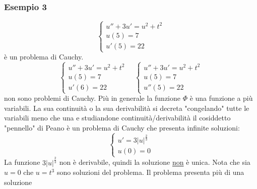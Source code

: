 \subsubsection*{Esempio 3}
\[
	\begin{cases}
		u'' + 3 u' = u^2 + t^2 \\
		u \left( 5 \right) = 7 \\
		u' \left( 5 \right) = 22
	\end{cases}
\]
è un problema di Cauchy.
\[
	\begin{cases}
		u'' + 3 u' = u^2 + t^2 \\
		u \left( 5 \right) = 7 \\
		u' \left( 6 \right) = 22
	\end{cases}
	\quad
	\begin{cases}
		u'' + 3 u' = u^2 + t^2 \\
		u \left( 5 \right) = 7 \\
		u'' \left( 5 \right) = 22
	\end{cases}
\]
non sono problemi di Cauchy. Più in generale
la funzione $ \Phi $ è una funzione a più variabili. La sua continuità o la sua derivabilità si decreta "congelando" tutte le variabili meno che una e studiandone continuità/derivabilità
il cosiddetto "pennello" di Peano è un problema di Cauchy che presenta infinite soluzioni:
\[
	\begin{cases}
		u'= 3 \left|u\right|^{\frac{2}{3}} \\
		u\left( 0 \right) =0
	\end{cases}
\]
La funzione $ 3 \left|u\right|^{\frac{2}{3}} $ non è derivabile, quindi la soluzione \underline{non} è unica. Nota che sia $ u=0 $ che $ u=t^3 $ sono soluzioni del problema. Il problema presenta più di una soluzione
